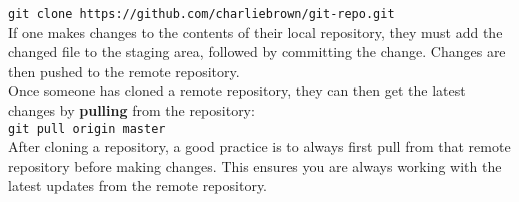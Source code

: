 \documentclass[12pt]{article}
\begin{document}
{\tt git clone https://github.com/charliebrown/git-repo.git} \\

\noindent
If one makes changes to the contents of their local repository, they must add the changed file to the staging area, followed by committing the change. Changes are then pushed to the remote repository. \\

\noindent
Once someone has cloned a remote repository, they can then get the latest changes by {\bf pulling} from the repository: \\

{\tt git pull origin master} \\

\noindent
After cloning a repository, a good practice is to always first pull from that remote repository before making changes. This ensures you are always working with the latest updates from the remote repository. \\
\end{document}

